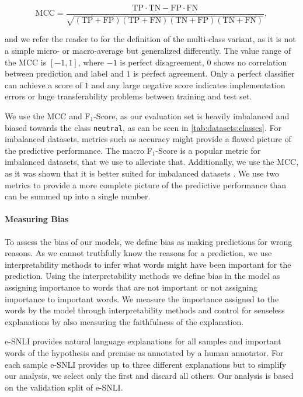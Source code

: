 {\small $$\text{MCC} = \frac{\mathrm
{TP} \cdot \mathrm{TN} - \mathrm{FP} \cdot \mathrm{FN}}{\sqrt{(\mathrm{TP}+\mathrm{FP})(\mathrm{TP}+\mathrm{FN})(\mathrm{TN}+\mathrm{FP})(\mathrm{TN}+\mathrm{FN})}},$$}

and we refer the reader to \citet{mccMultiClass} for the definition of the multi-class variant, as it is not a simple micro- or macro-average but generalized differently. The value range of the \ac{MCC} is $[-1, 1]$, where $-1$ is perfect disagreement, $0$ shows no correlation between prediction and label and $1$ is perfect agreement. Only a perfect classifier can achieve a score of $1$ and any large negative score indicates implementation errors or huge transferability problems between training and test set.

We use the \ac{MCC} and F$_1$-Score, as our evaluation set is heavily imbalanced and biased towards the class \texttt{neutral}, as can be seen in \autoref{tab:datasets:classes}. For imbalanced datasets, metrics such as accuracy might provide a flawed picture of the predictive performance. The macro F$_1$-Score is a popular metric for imbalanced datasets, that we use to alleviate that. Additionally, we use the \ac{MCC}, as it was shown that it is better suited for imbalanced datasets \cite{mccGood}. We use two metrics to provide a more complete picture of the predictive performance than can be summed up into a single number.

\paragraph{Measuring Bias} \label{sec:exp:eval:bias}
To assess the bias of our models, we define bias as making predictions for wrong reasons. As we cannot truthfully know the reasons for a prediction, we use interpretability methods to infer what words might have been important for the prediction. Using the interpretability methods we define bias in the model as assigning importance to words that are not important or not assigning importance to important words. We measure the importance assigned to the words by the model through interpretability methods and control for senseless explanations by also measuring the faithfulness of the explanation.

\ac{e-SNLI} provides natural language explanations for all samples and important words of the hypothesis and premise as annotated by a human annotator. For each sample \ac{e-SNLI} provides up to three different explanations but to simplify our analysis, we select only the first and discard all others. Our analysis is based on the validation split of \ac{e-SNLI}.

